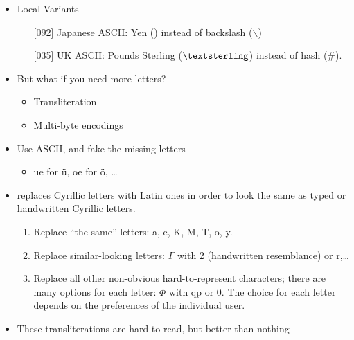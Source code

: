 \documentclass[a4paper,landscape,headrule,footrule,xetex]{foils}
\begin{document}
\begin{itemize}
\item Local Variants
  \begin{itemize}
  \item[{[092]}] Japanese ASCII: Yen ({}) instead of backslash
    ($\backslash$)
  \item[{[035]}] UK ASCII: Pounds Sterling ($\textsterling$) instead of hash (\#).
  \end{itemize}
\item But what if you need more letters?
  \begin{itemize}
  \item Transliteration
  \item Multi-byte encodings
  \end{itemize}
\end{itemize}








\begin{itemize}
\item Use ASCII, and fake the missing letters
  \begin{itemize}
  \item ue for \"u, oe for \"o, \ldots
  \end{itemize}
\item {} replaces Cyrillic letters with Latin ones in order to look the same as typed or handwritten Cyrillic letters.
  \begin{enumerate}
  \item Replace ``the same'' letters: a, e, K, M, T, o, y.
  \item    Replace similar-looking letters: $\Gamma$  with 2 (handwritten resemblance) or r,\ldots
  \item Replace all other non-obvious hard-to-represent characters;
    there are many options for each letter: $\Phi$ with qp or 0. The choice for each letter
    depends on the preferences of the individual user.
  \end{enumerate}
\item These transliterations are hard to read, but better than nothing
\end{itemize}
\end{document}
